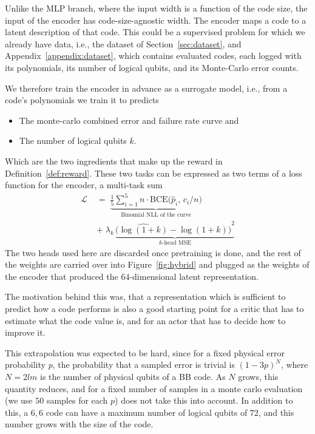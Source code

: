 \noindent Unlike the MLP branch, where the input width is a function of the code size, the input of the encoder has code-size-agnostic width.
The encoder maps a code to a latent description of that code.
This could be a supervised problem for which we already have data, i.e., the dataset of
Section~\ref{sec:dataset}, and Appendix~\ref{appendix:dataset}, which contains evaluated codes, each logged with its polynomials, its number
of logical qubits, and its Monte-Carlo error counts.

\noindent We therefore train the encoder in advance as a surrogate model, i.e., from a code's polynomials
\polynomials{} we train it to predicts
\begin{itemize}
      \item The monte-carlo combined error and failure rate curve and
      \item The number of logical qubits \(k\).
\end{itemize}
Which are the two ingredients that make up the reward in Definition~\ref{def:reward}.
These two tasks can be expressed as two terms of a loss function for the encoder, a multi-task sum
\begin{equation}
\begin{split}
  \mathcal{L} \;&=\; \underbrace{\tfrac{1}{5}\sum_{i=1}^{5} n\cdot\mathrm{BCE}\!\big(\hat p_i,\,c_i/n\big)}_{\text{Binomial NLL of the curve}}\\
  \;&+\; \lambda_k\,\underbrace{{\big(\widehat{\log(1+k)}-\log(1+k)\big)}^2}_{\text{\(k\)-head MSE}}
  \end{split}
\end{equation}
\noindent The two heads used here are discarded once pretraining is done, and the rest of the weights are carried over into
Figure~\ref{fig:hybrid} and plugged as the weights of the encoder that produced the \(64\)-dimensional latent representation.

\noindent The motivation behind this was, that a representation which is sufficient to predict how a code performs is also a
good starting point for a critic that has to estimate what the code value is, and for an actor that has to
decide how to improve it.

\noindent This extrapolation was expected to be hard, since for a fixed physical error probability \(p\), 
the probability that a sampled error is trivial is \({(1-3p)}^{N}\), where \(N=2lm\) is the number of physical qubits of a BB code. 
As \(N\) grows, this quantity reduces, and for a fixed number of samples in a monte carlo evaluation (we use \(50\) samples for each \(p\)) 
does not take this into account. In addition to this, a \(6,6\) code can have a maximum number of logical qubits of \(72\), and this number grows with the size of the code.

